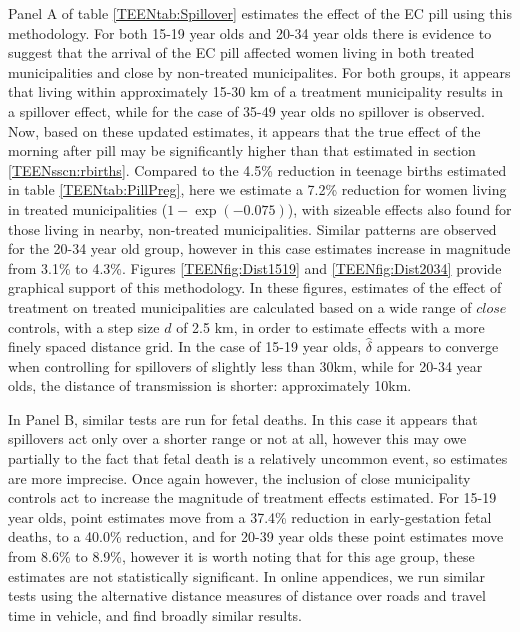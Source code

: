 Panel A of table \ref{TEENtab:Spillover} estimates the effect of the EC pill 
using this methodology. For both 15-19 year olds and 20-34 year olds there is
evidence to suggest that the arrival of the EC pill affected women living in both
treated municipalities and close by non-treated municipalites. For both groups,
it appears that living within approximately 15-30 km of a treatment municipality 
results in a spillover effect, while for the case of 35-49 year olds no spillover
is observed.  Now, based on these updated estimates, it appears that the true 
effect of the morning after pill may be significantly higher than that estimated 
in section \ref{TEENsscn:rbirths}.  Compared to the 4.5\% reduction in teenage 
births estimated in table \ref{TEENtab:PillPreg}, here we estimate a 7.2\% 
reduction for women living in treated municipalities ($1-\exp(-0.075)$), with 
sizeable effects also found for those living in nearby, non-treated 
municipalities.  Similar patterns are observed for the 20-34 year old group,
however in this case estimates increase in magnitude from 3.1\% to 4.3\%.
Figures \ref{TEENfig:Dist1519} and \ref{TEENfig:Dist2034} provide graphical
support of this methodology.  In these figures, estimates of the effect of 
treatment on treated municipalities are calculated based on 
a wide range of $close$ controls, with a step size $d$ of 2.5 km, in order to 
estimate effects with a more finely spaced distance grid.  In the case of 15-19 
year olds, $\hat\delta$ appears to converge when controlling for spillovers of 
slightly less than 30km, while for 20-34 year olds, the distance of transmission 
is shorter: approximately 10km.

In Panel B, similar tests are run for fetal deaths.  In this case it appears 
that spillovers act only over a shorter range or not at all, however this may 
owe partially to the fact that fetal death is a relatively uncommon event, so 
estimates are more imprecise.  Once again however, the inclusion of close 
municipality controls act to increase the magnitude of treatment effects 
estimated.  For 15-19 year olds, point estimates move from a 37.4\% reduction 
in early-gestation fetal deaths, to a 40.0\% reduction, and for 20-39 year olds
these point estimates move from 8.6\% to 8.9\%, however it is worth noting 
that for this age group, these estimates are not statistically significant.
In online appendices, we run similar tests using the alternative distance 
measures of distance over roads and travel time in vehicle, and find broadly
similar results.

